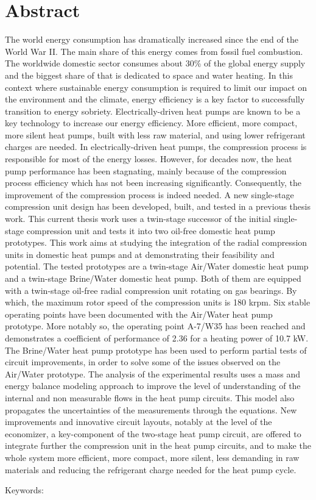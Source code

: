 \chapter{Abstract}
\label{chap:abstract}

The world energy consumption has dramatically increased since the end
of the World War II. The main share of this energy comes from fossil
fuel combustion. The worldwide domestic sector consumes about 30\% of
the global energy supply and the biggest share of that is dedicated to
space and water heating. In this context where sustainable energy
consumption is required to limit our impact on the environment and the
climate, energy efficiency is a key factor to successfully transition
to energy sobriety. Electrically-driven heat pumps are known to be a
key technology to increase our energy efficiency. More efficient, more
compact, more silent heat pumps, built with less raw material, and
using lower refrigerant charges are needed. In electrically-driven
heat pumps, the compression process is responsible for most of the
energy losses. However, for decades now, the heat pump performance has
been stagnating, mainly because of the compression process efficiency
which has not been increasing significantly. Consequently, the
improvement of the compression process is indeed needed. A new
single-stage compression unit design has been developed, built, and
tested in a previous thesis work. This current thesis work uses a
twin-stage successor of the initial single-stage compression unit and
tests it into two oil-free domestic heat pump prototypes. This work
aims at studying the integration of the radial compression units in
domestic heat pumps and at demonstrating their feasibility and
potential. The tested prototypes are a twin-stage Air/Water domestic
heat pump and a twin-stage Brine/Water domestic heat pump. Both of
them are equipped with a twin-stage oil-free radial compression unit
rotating on gas bearings. By which, the maximum rotor speed of the
compression units is 180 krpm. Six stable operating points have been
documented with the Air/Water heat pump prototype. More notably so,
the operating point A-7/W35 has been reached and demonstrates a
coefficient of performance of 2.36 for a heating power of 10.7 kW. The
Brine/Water heat pump prototype has been used to perform partial tests
of circuit improvements, in order to solve some of the issues observed
on the Air/Water prototype. The analysis of the experimental results
uses a mass and energy balance modeling approach to improve the level
of understanding of the internal and non measurable flows in the heat
pump circuits. This model also propagates the uncertainties of the
measurements through the equations. New improvements and innovative
circuit layouts, notably at the level of the economizer, a key-component
of the two-stage heat pump circuit, are offered to integrate further
the compression unit in the heat pump circuits, and to make the whole
system more efficient, more compact, more silent, less demanding in
raw materials and reducing the refrigerant charge needed for the heat
pump cycle.

\vspace{10mm}

Keywords:~\varuskeywords
